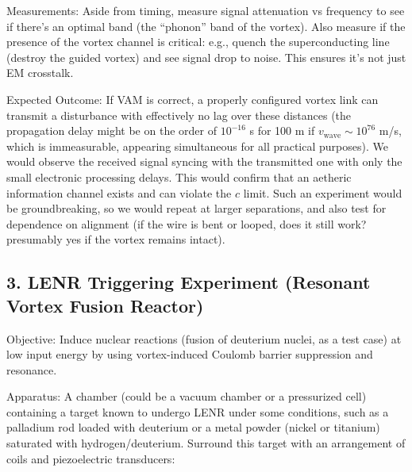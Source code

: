 Measurements: Aside from timing, measure signal attenuation vs frequency to see if there's an optimal band (the “phonon” band of the vortex). Also measure if the presence of the vortex channel is critical: e.g., quench the superconducting line (destroy the guided vortex) and see signal drop to noise. This ensures it’s not just EM crosstalk.


Expected Outcome: If VAM is correct, a properly configured vortex link can transmit a disturbance with effectively no lag over these distances (the propagation delay might be on the order of $10^{-16}$ s for 100 m if $v_{\text{wave}}\sim10^{76}$ m/s, which is immeasurable, appearing simultaneous for all practical purposes). We would observe the received signal syncing with the transmitted one with only the small electronic processing delays. This would confirm that an aetheric information channel exists and can violate the $c$ limit. Such an experiment would be groundbreaking, so we would repeat at larger separations, and also test for dependence on alignment (if the wire is bent or looped, does it still work? presumably yes if the vortex remains intact).


\subsection*{3. LENR Triggering Experiment (Resonant Vortex Fusion Reactor)}

Objective: Induce nuclear reactions (fusion of deuterium nuclei, as a test case) at low input energy by using vortex-induced Coulomb barrier suppression and resonance.


Apparatus: A chamber (could be a vacuum chamber or a pressurized cell) containing a target known to undergo LENR under some conditions, such as a palladium rod loaded with deuterium or a metal powder (nickel or titanium) saturated with hydrogen/deuterium. Surround this target with an arrangement of coils and piezoelectric transducers:


